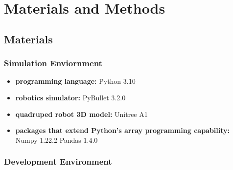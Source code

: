 \chapter{Materials and Methods}

\section{Materials}

\subsection{Simulation Enviornment}

\begin{itemize}
   \item \textbf{programming language:} Python 3.10
   \item \textbf{robotics simulator:} PyBullet 3.2.0
   \item \textbf{quadruped robot 3D model:} Unitree A1
   \item \textbf{packages that extend Python's array programming capability:}
      \subitem Numpy 1.22.2
      \subitem Pandas 1.4.0
\end{itemize}

\subsection{Development Environment}


